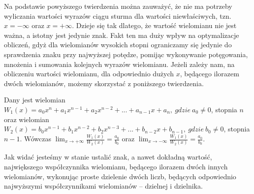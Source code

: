 Na podstawie powyższego twierdzenia można zauważyć, że nie ma potrzeby wyliczania wartości wyrazów ciągu sturma dla wartości niewłaściwych, tzn. $x=-\infty$ oraz $x=+\infty.$ Dzieje się tak dlatego, że wartość wielomianu nie jest ważna, a istotny jest jedynie znak. Fakt ten ma duży wpływ na optymalizacje obliczeń, gdyż dla wielomianów wysokich stopni ograniczamy się jedynie do sprawdzenia znaku przy najwyższej potędze, pomijąc wykonywanie potęgowania, mnożenia i sumowania kolejnych wyrazów wielomianu.
Jeżeli zależy nam, na obliczeniu wartości wielomianu, dla odpowiednio dużych $x$, będącego ilorazem dwóch wielomianów, możemy skorzystać z poniższego twierdzenia.

\begin{theorem}
	$ $ \\
	Dany jest wielomian $W_1(x) = a_0x^n + a_1x^{n-1} + a_2x^{n-2} + ... + a_{n-1}x + a_n,\ gdzie \ a_0 \ne 0$, stopnia $n$ oraz wielomian $W_2(x) = b_0x^{n-1} + b_1x^{n-2} + b_2x^{n-3} + ... + b_{n-2}x + b_{n-1},\ gdzie\ b_0 \ne 0$, stopnia $n-1$. Wówczas $\lim_{x \to +\infty}\frac{W_1(x)}{W_2(x)} = \frac{a_0}{b_0}$ oraz $\lim_{x \to -\infty}\frac{W_1(x)}{W_2(x)} = \frac{a_0}{b_0}.$
\end{theorem}

Jak widać jesteśmy w stanie ustalić znak, a nawet dokładną wartość, największego współczynnika wielomianu, będącego ilorazem dwóch innych wielomianów, wykonując proste dzielenie dwóch liczb, będących odpowiednio najwyższymi współczynnikami wielomianów -- dzielnej i dzielnika.